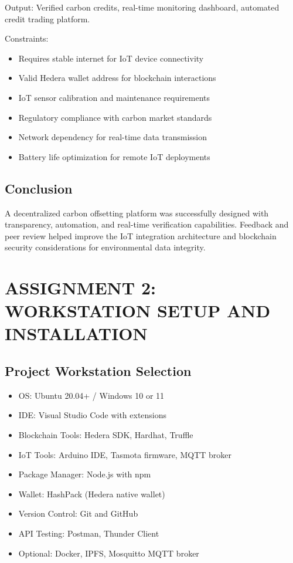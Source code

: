 \documentclass[oneside,a4paper,12pt]{book}
\begin{document}
\begin{appendices}
Output: Verified carbon credits, real-time monitoring dashboard, automated credit trading platform.

Constraints:
\begin{itemize}
    \item Requires stable internet for IoT device connectivity
    \item Valid Hedera wallet address for blockchain interactions
    \item IoT sensor calibration and maintenance requirements
    \item Regulatory compliance with carbon market standards
    \item Network dependency for real-time data transmission
    \item Battery life optimization for remote IoT deployments
\end{itemize}

\subsection{Conclusion}
A decentralized carbon offsetting platform was successfully designed with transparency, automation, and real-time verification capabilities. Feedback and peer review helped improve the IoT integration architecture and blockchain security considerations for environmental data integrity.

\newpage

\section{ASSIGNMENT 2: WORKSTATION SETUP AND INSTALLATION}

\subsection{Project Workstation Selection}
\begin{itemize}
    \item OS: Ubuntu 20.04+ / Windows 10 or 11
    \item IDE: Visual Studio Code with extensions
    \item Blockchain Tools: Hedera SDK, Hardhat, Truffle
    \item IoT Tools: Arduino IDE, Tasmota firmware, MQTT broker
    \item Package Manager: Node.js with npm
    \item Wallet: HashPack (Hedera native wallet)
    \item Version Control: Git and GitHub
    \item API Testing: Postman, Thunder Client
    \item Optional: Docker, IPFS, Mosquitto MQTT broker
\end{itemize}


\end{appendices}
\end{document}
